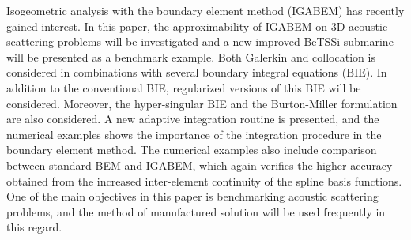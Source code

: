 Isogeometric analysis with the boundary element method (IGABEM) has recently gained interest. In this paper, the approximability of IGABEM on 3D acoustic scattering problems will be investigated and a new improved BeTSSi submarine will be presented as a benchmark example. Both Galerkin and collocation is considered in combinations with several boundary integral equations (BIE). In addition to the conventional BIE, regularized versions of this BIE will be considered. Moreover, the hyper-singular BIE and the Burton-Miller formulation are also considered. A new adaptive integration routine is presented, and the numerical examples shows the importance of the integration procedure in the boundary element method. The numerical examples also include comparison between standard BEM and IGABEM, which again verifies the higher accuracy obtained from the increased inter-element continuity of the spline basis functions. One of the main objectives in this paper is benchmarking acoustic scattering problems, and the method of manufactured solution will be used frequently in this regard.